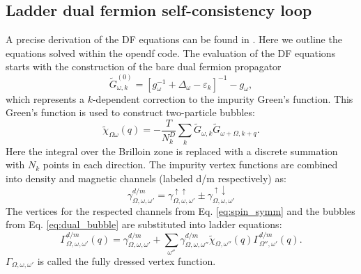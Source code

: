 \documentclass[3p,times,procedia]{elsarticle}
\begin{document}
\subsection{Ladder dual fermion self-consistency loop}
A precise derivation of the DF equations can be found in \cite{Hafermann2012, Antipov2014}. Here we outline the equations solved within the opendf code. The evaluation of the DF equations  starts with the construction of the bare dual fermion propagator
\begin{equation}
\tilde G^{(0)}_{\omega,k} = \left[g_{\omega}^{-1} + \Delta_\omega - \varepsilon_k\right]^{-1} - g_{\omega}, \label{eq:gd0}
\end{equation}
which represents a $k$-dependent correction to the impurity Green's function. This Green's function is used to construct two-particle bubbles: 
\begin{equation}\label{eq:dual_bubble}
\tilde \chi_{\Omega\omega}(q) = -\frac{T}{N_k^D} \sum_k \tilde G_{\omega, k} \tilde G_{\omega + \Omega, k+q}.
\end{equation}
Here the integral over the Brilloin zone is replaced with a discrete summation with $N_k$ points in each direction. The impurity vertex functions are combined into density and magnetic channels (labeled d/m respectively) as: 
\begin{equation}\label{eq:spin_symm}
\gamma^{d/m}_{\Omega,\omega,\omega'} = \gamma^{\uparrow\uparrow}_{\Omega,\omega,\omega'} \pm \gamma^{\uparrow\downarrow}_{\Omega,\omega,\omega'}
\end{equation}
The vertices for the respected channels from Eq. \ref{eq:spin_symm} and the bubbles from Eq. \ref{eq:dual_bubble} are substituted into ladder equations:
\begin{equation}\label{eq:dual_ladder}
\Gamma^{d/m}_{\Omega,\omega,\omega'}(q) = \gamma^{d/m}_{\Omega,\omega,\omega'} + \sum_{\omega''} \gamma^{d/m}_{\Omega,\omega,\omega''} \tilde\chi_{\Omega,\omega''}(q) \Gamma^{d/m}_{\Omega'',\omega'}(q).
\end{equation}
 $\Gamma_{\Omega,\omega,\omega'}$ is called the fully dressed vertex function.
\end{document}
